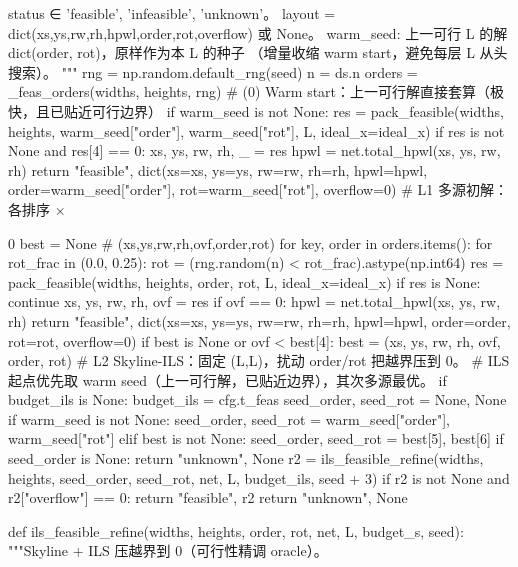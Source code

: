 \documentclass{JXUSTmodeling}
\begin{document}
\begin{appendixx}
\begin{python}
    status ∈ {'feasible', 'infeasible', 'unknown'}。
    layout = dict(xs,ys,rw,rh,hpwl,order,rot,overflow) 或 None。
    warm_seed: 上一可行 L 的解 dict(order, rot)，原样作为本 L 的种子
               （增量收缩 warm start，避免每层 L 从头搜索）。
    """
    rng = np.random.default_rng(seed)
    n = ds.n
    orders = _feas_orders(widths, heights, rng)
    # (0) Warm start：上一可行解直接套算（极快，且已贴近可行边界）
    if warm_seed is not None:
        res = pack_feasible(widths, heights, warm_seed["order"],
                            warm_seed["rot"], L, ideal_x=ideal_x)
        if res is not None and res[4] == 0:
            xs, ys, rw, rh, _ = res
            hpwl = net.total_hpwl(xs, ys, rw, rh)
            return "feasible", dict(xs=xs, ys=ys, rw=rw, rh=rh, hpwl=hpwl,
                                    order=warm_seed["order"],
                                    rot=warm_seed["rot"], overflow=0)
    # L1 多源初解：各排序 × {0%
    best = None        # (xs,ys,rw,rh,ovf,order,rot)
    for key, order in orders.items():
        for rot_frac in (0.0, 0.25):
            rot = (rng.random(n) < rot_frac).astype(np.int64)
            res = pack_feasible(widths, heights, order, rot, L, ideal_x=ideal_x)
            if res is None:
                continue
            xs, ys, rw, rh, ovf = res
            if ovf == 0:
                hpwl = net.total_hpwl(xs, ys, rw, rh)
                return "feasible", dict(xs=xs, ys=ys, rw=rw, rh=rh, hpwl=hpwl,
                                        order=order, rot=rot, overflow=0)
            if best is None or ovf < best[4]:
                best = (xs, ys, rw, rh, ovf, order, rot)
    # L2 Skyline-ILS：固定 (L,L)，扰动 order/rot 把越界压到 0。
    # ILS 起点优先取 warm seed（上一可行解，已贴近边界），其次多源最优。
    if budget_ils is None:
        budget_ils = cfg.t_feas
    seed_order, seed_rot = None, None
    if warm_seed is not None:
        seed_order, seed_rot = warm_seed["order"], warm_seed["rot"]
    elif best is not None:
        seed_order, seed_rot = best[5], best[6]
    if seed_order is None:
        return "unknown", None
    r2 = ils_feasible_refine(widths, heights, seed_order, seed_rot, net, L,
                             budget_ils, seed + 3)
    if r2 is not None and r2["overflow"] == 0:
        return "feasible", r2
    return "unknown", None


def ils_feasible_refine(widths, heights, order, rot, net, L, budget_s, seed):
    """Skyline + ILS 压越界到 0（可行性精调 oracle）。

}
\end{python}
\end{appendixx}
\end{document}
